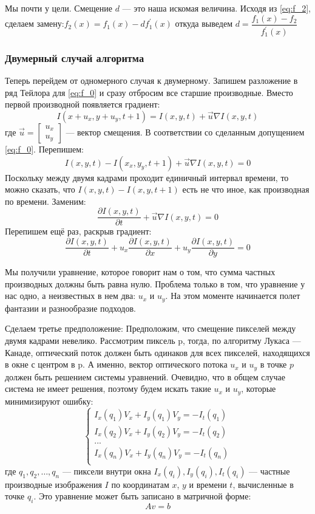 Мы почти у цели. Смещение $d$ — это наша искомая величина. Исходя из \ref{eq:f_2}, сделаем замену:$f_2(x)=f_1(x)-df_1^{'}(x)$
откуда выведем $d = \dfrac{f_1(x)-f_2}{f_1^{'}(x)}$
\subsubsection{Двумерный случай алгоритма}

Теперь перейдем от одномерного случая к двумерному. Запишем разложение в ряд Тейлора для \ref{eq:f_0} и сразу отбросим все старшие производные. Вместо первой производной появляется градиент:
$$I(x+u_x,y+u_y,t+1)=I(x,y,t)+\overrightarrow{u} \nabla I(x,y,t)$$
где $\overrightarrow{u} = \begin{bmatrix}
u_x\\
u_y
\end{bmatrix} $ — вектор смещения.
В соответствии со сделанным допущением \ref{eq:f_0}. Перепишем:
$$I(x,y,t)-I(x_x,y_y,t+1) + \overrightarrow{u} \nabla I(x,y,t) = 0$$
Поскольку между двумя кадрами проходит единичный интервал времени, то можно сказать, что $I(x,y,t)-I(x,y,t+1)$ есть не что иное, как производная по времени.
Заменим:
$$\frac{\partial I(x,y,t)}{\partial t} + \overrightarrow{u} \nabla I(x,y,t) = 0$$
Перепишем ещё раз, раскрыв градиент:
$$\frac{\partial I(x,y,t)}{\partial t} + u_x\frac{\partial I(x,y,t)}{\partial x} + u_y\frac{\partial I(x,y,t)}{\partial y} = 0$$

Мы получили уравнение, которое говорит нам о том, что сумма частных производных должны быть равна нулю. Проблема только в том, что уравнение у нас одно, а неизвестных в нем два: $u_x$ и $u_y$. На этом моменте начинается полет фантазии и разнообразие подходов.

Сделаем третье предположение: Предположим, что смещение пикселей между двумя кадрами невелико. Рассмотрим пиксель p, тогда, по алгоритму Лукаса — Канаде, оптический поток должен быть одинаков для всех пикселей, находящихся в окне с центром в p. А именно, вектор оптического потока $u_x$ и $u_y$ в точке $p$ должен быть решением системы уравнений. Очевидно, что в общем случае система не имеет решения, поэтому будем искать такие $u_x$ и $u_y$, которые минимизируют ошибку:
$$
\begin{cases}
I_x(q_1) V_x + I_y (q_1) V_y = -I_t(q_1)\\
I_x(q_2) V_x + I_y (q_2) V_y = -I_t(q_2)\\
...\\
I_x(q_n) V_x + I_y (q_n) V_y = -I_t(q_n)\\
\end{cases}
$$
где $q_1,q_2,\dots,q_n$ — пиксели внутри окна
$I_x(q_i),I_y(q_i),I_t(q_i)$ — частные производные изображения $I$ по координатам $x$, $y$ и времени $t$, вычисленные в точке $q_i$.
Это уравнение может быть записано в матричной форме:
$$A v = b$$

